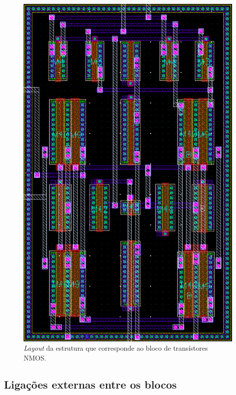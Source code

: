\documentclass[11pt]{article}
\numberwithin{equation}{section}
\begin{document}
\begin{figure}[H]
	\centering
	\includegraphics[keepaspectratio=true, scale=0.50]{exps/layout/nmos}
	\vspace{-0.5em}
	\caption{\textit{Layout} da estrutura que corresponde ao bloco de transístores NMOS.}
	\vspace{-0.8em} 
\end{figure}

\pagebreak

\subsection{Ligações externas entre os blocos}
\end{document}
